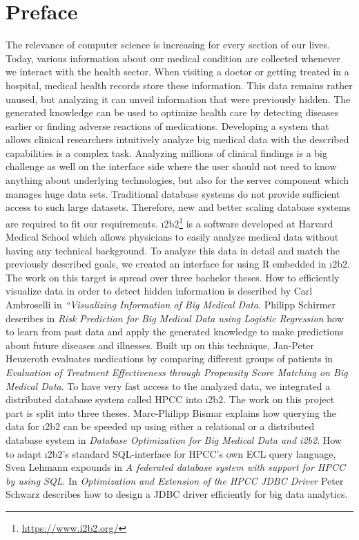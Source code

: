 \section*{Preface}

The relevance of computer science is increasing for every section of our lives. Today, various information about our medical condition are collected whenever we interact with the health sector. When visiting a doctor or getting treated in a hospital, medical health records store these information. This data remains rather unused, but analyzing it can unveil information that were previously hidden. The generated knowledge can be used to optimize health care by detecting diseases earlier or finding adverse reactions of medications.
Developing a system that allows clinical researchers intuitively analyze big medical data with the described capabilities is a complex task. Analyzing millions of clinical findings is a big challenge as well on the interface side where the user should not need to know anything about underlying technologies, but also for the server component which manages huge data sets. Traditional database systems do not provide sufficient access to such large datasets. Therefore, new and better scaling database systems are required to fit our requirements.
\i2b2\footnote{\url{https://www.i2b2.org/}} is a software developed at Harvard Medical School which allows physicians to easily analyze medical data without having any technical background. To analyze this data in detail and match the previously described goals, we created an interface for using R embedded in \i2b2.\\

The work on this target is spread over three bachelor theses. How to efficiently visualize data in order to detect hidden information is described by Carl Ambroselli in \textit{“Visualizing Information of Big Medical Data}. Philipp Schirmer describes in \textit{Risk Prediction for Big Medical Data using Logistic Regression} how to learn from past data and apply the generated knowledge to make predictions about future diseases and illnesses. Built up on this technique,  Jan-Peter Heuzeroth  evaluates medications by comparing different groups of patients in \textit{Evaluation of Treatment Effectiveness through Propensity Score Matching on Big Medical Data}.
To have very fast access to the analyzed data, we integrated a distributed database system called HPCC into \i2b2. The work on this project part is split into three theses. Marc-Philipp Bismar explains how querying the data for \i2b2 can be speeded up using either a relational or a distributed database system in \textit{Database Optimization for Big Medical Data and i2b2}. How to adapt \i2b2’s standard SQL-interface for HPCC’s own ECL query language, Sven Lehmann expounds in \textit{A federated database system with support for HPCC by using SQL}. In \textit{Optimization and Extension of the HPCC JDBC Driver} Peter Schwarz describes how to design a JDBC driver efficiently for big data analytics.